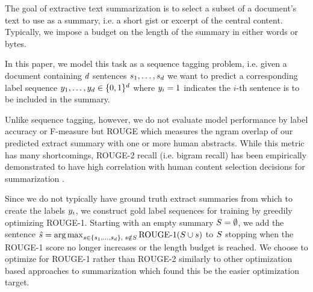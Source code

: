 The goal of extractive text summarization is to select a subset of a document's
text to use as a summary, i.e. a short gist or excerpt of the central content.
Typically, we impose a budget on the length of the summary in either 
words or bytes.

In this paper, we model this task as a sequence tagging problem, 
i.e. given a document containing $d$ sentences $s_1, \ldots, 
s_{d}$ we want to predict a corresponding label sequence $y_1,
\ldots, y_{d} \in \{0, 1\}^{d}$ where $y_i = 1$ 
indicates the $i$-th sentence is to be included in the summary.

Unlike sequence tagging, however, we do not evaluate model performance 
by label accuracy or F-measure but ROUGE \cite{rouge} which measures the ngram
overlap of our predicted extract summary with one or more human abstracts.
While this metric has many shortcomings, ROUGE-2 recall (i.e. bigram recall)
has been empirically demonstrated to have high correlation with human 
content selection decisions for summarization \cite{ducrouge}.

Since we do not typically have ground truth extract summaries from which to
create the labels $y_i$, we construct gold label sequences for training
by greedily optimizing ROUGE-1. Starting with an empty summary $\summary = 
\null \emptyset$, we add the sentence $\hat{s} = 
{\operatorname*{arg\,max}}_{ s \in \{s_1, \ldots, s_{d}\},
\; s \notin S} \operatorname{ROUGE-1}(S \cup s)$
to $S$ stopping when the ROUGE-1 score no longer increases or the 
length budget is reached. We choose to optimize for ROUGE-1 rather than 
ROUGE-2 similarly to other optimization based approaches to summarization
\cite{durret,joachims,nallapati,maybe_learning_submod_sum} which found this
be the easier optimization target.
